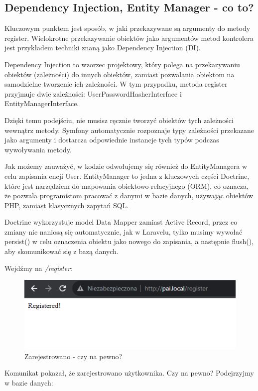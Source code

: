\documentclass[polish, a4paper]{article}
\begin{document}
\subsection{Dependency Injection, Entity Manager - co to?}
Kluczowym punktem jest sposób, w jaki przekazywane są argumenty do metody register. Wielokrotne przekazywanie obiektów jako argumentów metod kontrolera jest przykładem techniki znaną jako Dependency Injection (DI).

Dependency Injection to wzorzec projektowy, który polega na przekazywaniu obiektów (zależności) do innych obiektów, zamiast pozwalania obiektom na samodzielne tworzenie ich zależności. W tym przypadku, metoda register przyjmuje dwie zależności: UserPasswordHasherInterface i EntityManagerInterface.

Dzięki temu podejściu, nie musisz ręcznie tworzyć obiektów tych zależności wewnątrz metody. Symfony automatycznie rozpoznaje typy zależności przekazane jako argumenty i dostarcza odpowiednie instancje tych typów podczas wywoływania metody.

Jak możemy zauważyć, w kodzie odwołujemy się również do EntityManagera w celu zapisania encji User. EntityManager to jedna z kluczowych części Doctrine, które jest narzędziem do mapowania obiektowo-relacyjnego (ORM), co oznacza, że pozwala programistom pracować z danymi w bazie danych, używając obiektów PHP, zamiast klasycznych zapytań SQL.

Doctrine wykorzystuje model Data Mapper zamiast Active Record, przez co zmiany nie naniosą się automatycznie, jak w Laravelu, tylko musimy wywołać persist() w celu oznaczenia obiektu jako nowego do zapisania, a następnie flush(), aby skomunikować się z bazą danych.

Wejdźmy na \emph{/register}:


\begin{figure}[H]
  \centering
  \includegraphics[width=\textwidth]{registered.png}
  \caption{Zarejestrowano - czy na pewno?}
\end{figure}

Komunikat pokazał, że zarejestrowano użytkownika. Czy na pewno? Podejrzyjmy w bazie danych:
\end{document}
